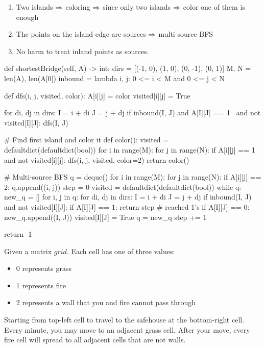 \begin{enumerate}
\item Two islands $\Rightarrow$ coloring $\Rightarrow$ since only two islands $\Rightarrow$ color one of them is enough
\item The points on the island edge are sources $\Rightarrow$ multi-source BFS 
\item No harm to treat inland points as sources. 
\end{enumerate}
\begin{python}
def shortestBridge(self, A) -> int:
  dirs = [(-1, 0), (1, 0), (0, -1), (0, 1)]
  M, N = len(A), len(A[0])
  inbound = lambda i, j: 0 <= i < M and 0 <= j < N

  def dfs(i, j, visited, color):
    A[i][j] = color
    visited[i][j] = True
    
    for di, dj in dirs:
      I = i + di
      J = j + dj
      if inbound(I, J) and A[I][J] == 1 \
        and not visited[I][J]:
        dfs(I, J)

  # Find first island and color it
  def color():
    visited = defaultdict(defaultdict(bool))
    for i in range(M):
      for j in range(N):
        if A[i][j] == 1 and not visited[i][j]:
          dfs(i, j, visited, color=2)
          return
  color()
  
  # Multi-source BFS
  q = deque()
  for i in range(M):
    for j in range(N):
      if A[i][j] == 2:
        q.append((i, j))
  step = 0 
  visited = defaultdict(defaultdict(bool))
  while q:
    new_q = []
    for i, j in q:
      for di, dj in dirs:
        I = i + di
        J = j + dj
        if inbound(I, J) and not visited[I][J]:
          if A[I][J] == 1:
            return step  # reached 1's
          if A[I][J] == 0:
            new_q.append((I, J))
            visited[I][J] = True
    q = new_q
    step += 1

  return -1
\end{python}
 Given a matrix $grid$. Each cell has one of three values:
\begin{itemize}
\item 0 represents grass
\item 1 represents fire
\item 2 represents a wall that you and fire cannot pass through
\end{itemize}
Starting from top-left cell to travel to the safehouse at the bottom-right cell. Every minute, you may move to an adjacent grass cell. After your move, every fire cell will spread to all adjacent cells that are not walls.

